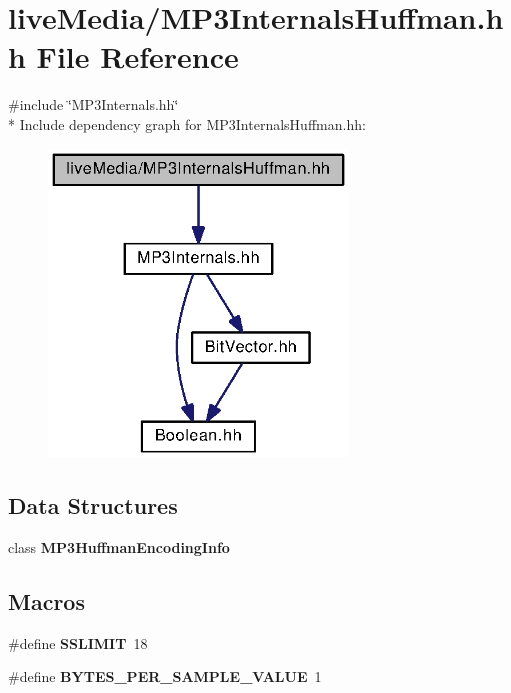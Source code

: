 \section{live\+Media/\+M\+P3\+Internals\+Huffman.hh File Reference}
\label{MP3InternalsHuffman_8hh}
{\ttfamily \#include \char`\"{}M\+P3\+Internals.\+hh\char`\"{}}\\*
Include dependency graph for M\+P3\+Internals\+Huffman.\+hh\+:
\nopagebreak
\begin{figure}[H]
\begin{center}
\leavevmode
\includegraphics[width=226pt]{MP3InternalsHuffman_8hh__incl}
\end{center}
\end{figure}
\subsection*{Data Structures}
\begin{DoxyCompactItemize}
\item 
class {\bf M\+P3\+Huffman\+Encoding\+Info}
\end{DoxyCompactItemize}
\subsection*{Macros}
\begin{DoxyCompactItemize}
\item 
\#define {\bf S\+S\+L\+I\+M\+I\+T}~18
\item 
\#define {\bf B\+Y\+T\+E\+S\+\_\+\+P\+E\+R\+\_\+\+S\+A\+M\+P\+L\+E\+\_\+\+V\+A\+L\+U\+E}~1
\end{DoxyCompactItemize}
